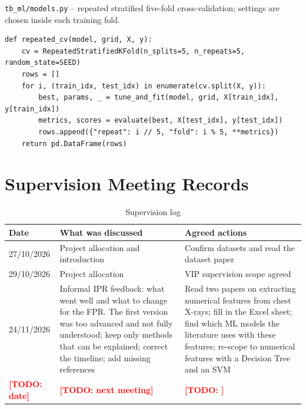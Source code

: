 \documentclass[11pt,a4paper]{article}
\newcommand{\todo}[1]{\textcolor{red}{\textbf{[TODO: #1]}}}
\begin{document}
\begin{appendices}
\noindent \texttt{tb\_ml/models.py} -- repeated stratified five-fold cross-validation; settings are chosen inside each training fold.
\begin{lstlisting}
def repeated_cv(model, grid, X, y):
    cv = RepeatedStratifiedKFold(n_splits=5, n_repeats=5, random_state=SEED)
    rows = []
    for i, (train_idx, test_idx) in enumerate(cv.split(X, y)):
        best, params, _ = tune_and_fit(model, grid, X[train_idx], y[train_idx])
        metrics, scores = evaluate(best, X[test_idx], y[test_idx])
        rows.append({"repeat": i // 5, "fold": i % 5, **metrics})
    return pd.DataFrame(rows)
\end{lstlisting}

\section{Supervision Meeting Records}
\begin{table}[htbp]
  \centering
  \caption{Supervision log}
  \footnotesize
  \begin{tabularx}{\linewidth}{l X X}
    \toprule
    Date & What was discussed & Agreed actions \\
    \midrule
    27/10/2026 & Project allocation and introduction & Confirm datasets and read the dataset paper \\
    29/10/2026 & Project allocation & VIP supervision scope agreed \\
    24/11/2026 & Informal IPR feedback: what went well and what to change for the FPR. The first version was too advanced and not fully understood; keep only methods that can be explained; correct the timeline; add missing references & Read two papers on extracting numerical features from chest X-rays; fill in the Excel sheet; find which ML models the literature uses with these features; re-scope to numerical features with a Decision Tree and an SVM \\
    \todo{date} & \todo{next meeting} & \todo{} \\
    \bottomrule
  \end{tabularx}
\end{table}
\end{appendices}
\end{document}
